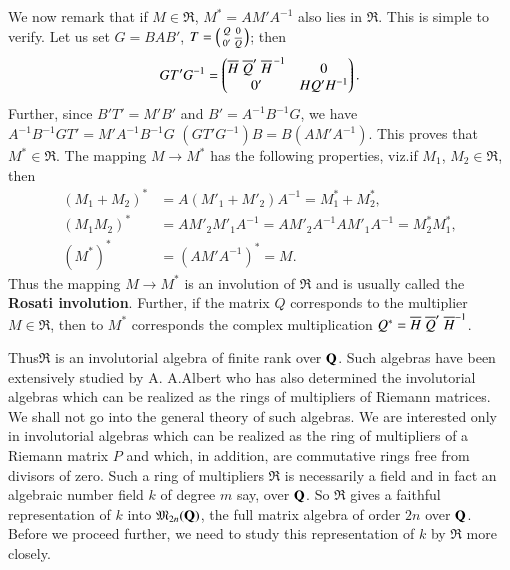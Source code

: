 We now remark that if $M\in\mathfrak{R}$, $M^{\ast}=AM'A^{-1}$ also
lies in $\mathfrak{R}$. This is simple to verify. Let us set $G=BAB'$,
$T=\left(\begin{smallmatrix} Q & 0\\ 0' & \overline{Q}
\end{smallmatrix}\right)$; then
$$
GT'G^{-1}=
\begin{pmatrix}
\overline{H} \; \overline{Q}' \; {\overline{H}}^{ \, -1} & 0\\
0' & HQ'H^{-1}
\end{pmatrix}.
$$
Further, since $B'T'=M'B'$ and $B'=A^{-1}B^{-1}G$, we have
$A^{-1}B^{-1}GT'=M'A^{-1}B^{-1}G$ \ie
$(GT'G^{-1})B=B(AM'A^{-1})$. This proves that
$M^{\ast}\in\mathfrak{R}$. The mapping $M\to M^{\ast}$ has the
following properties, viz.\@ if $M_{1}$, $M_{2}\in\mathfrak{R}$, then
\begin{align*}
(M_{1}+M_{2})^{\ast} &=
  A(M'_{1}+M'_{2})A^{-1}=M^{\ast}_{1}+M^{\ast}_{2},\\
(M_{1}M_{2})^{\ast} &=
  AM'_{2}M'_{1}A^{-1}=AM'_{2}A^{-1}AM'_{1}A^{-1}=M^{\ast}_{2}M^{\ast}_{1},\\
(M^{\ast})^{\ast} &= (AM'A^{-1})^{\ast}=M. 
\end{align*}
Thus the mapping $M\to M^{\ast}$ is an involution of $\mathfrak{R}$
and is usually called the {\bf Rosati involution}. Further, if the
matrix $Q$ corresponds to the multiplier $M\in\mathfrak{R}$, then to
$M^{\ast}$ corresponds the complex multiplication
$Q^{\ast}=\overline{H} \; \overline{Q}' \; {\overline{H}}^{-1}$. 

Thus\pageoriginale $\mathfrak{R}$ is an involutorial algebra of finite
rank over $\mathbf{Q}$. Such algebras have been extensively studied by A.\@
A.\@ Albert who has also determined the involutorial algebras which
can be realized as the rings of multipliers of Riemann matrices. We
shall not go into the general theory of such algebras. We are
interested only in involutorial algebras which can be realized as the
ring of multipliers of a Riemann matrix $P$ and which, in addition,
are commutative rings free from divisors of zero. Such a ring of
multipliers $\mathfrak{R}$ is necessarily a field and in fact an
algebraic number field $k$ of degree $m$ say, over $\mathbf{Q}$. So
$\mathfrak{R}$ gives a faithful representation of $k$ into
$\mathfrak{M}_{2n}(\mathbf{Q})$, the full matrix algebra of order $2n$ over
$\mathbf{Q}$. Before we proceed further, we need to study this representation
of $k$ by $\mathfrak{R}$ more closely.

